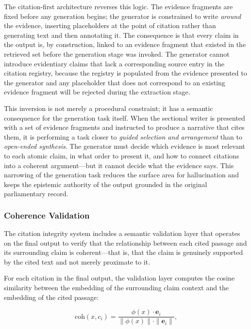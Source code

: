 The citation-first architecture reverses this logic. The evidence fragments are fixed before
any generation begins; the generator is constrained to write \textit{around} the evidence,
inserting placeholders at the point of citation rather than generating text and then
annotating it. The consequence is that every claim in the output is, by construction, linked
to an evidence fragment that existed in the retrieved set before the generation stage was
invoked. The generator cannot introduce evidentiary claims that lack a corresponding source
entry in the citation registry, because the registry is populated from the evidence presented
to the generator and any placeholder that does not correspond to an existing evidence fragment
will be rejected during the extraction stage.

This inversion is not merely a procedural constraint; it has a semantic consequence for the
generation task itself. When the sectional writer is presented with a set of evidence
fragments and instructed to produce a narrative that cites them, it is performing a task closer
to \textit{guided selection and arrangement} than to \textit{open-ended synthesis}. The
generator must decide which evidence is most relevant to each atomic claim, in what order to
present it, and how to connect citations into a coherent argument---but it cannot decide what
the evidence says. This narrowing of the generation task reduces the surface area for
hallucination and keeps the epistemic authority of the output grounded in the original
parliamentary record.

\subsubsection{Coherence Validation}

The citation integrity system includes a semantic validation layer that operates on the final
output to verify that the relationship between each cited passage and its surrounding claim is
coherent---that is, that the claim is genuinely supported by the cited text and not merely
proximate to it.

For each citation in the final output, the validation layer computes the cosine similarity
between the embedding of the surrounding claim context and the embedding of the cited passage:

\begin{equation}
    \text{coh}(x, c_i) = \frac{\phi(x) \cdot \mathbf{e}_i}{\|\phi(x)\| \cdot \|\mathbf{e}_i\|},
\end{equation}

